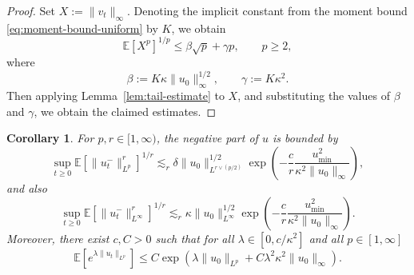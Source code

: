 \documentclass[a4paper,12pt]{article}
\newtheorem{corollary}[theorem]{Corollary}
\newcommand{\E}{\mathbb{E}}
\begin{document}
\begin{proof}
Set $X:=\| v_t\|_\infty$. Denoting the implicit constant from the moment bound  \eqref{eq:moment-bound-uniform} by $K$, we obtain
\[
\mathbb{E}[X^p]^{1/p} \leq \beta \sqrt{p} + \gamma p, \qquad p \geq 2, 
\]
where
\[ 
   \beta := K \kappa \| u_0 \|_{\infty}^{1 / 2},
     \qquad \gamma := K \kappa^2 . 
\]
Then applying Lemma~\ref{lem:tail-estimate} to $X$, and substituting the values of $\beta$ and $\gamma$,  we obtain the claimed estimates.
\end{proof}



\begin{corollary}
  \label{cor:exp-moments-u}
  For $p,r \in [1,\infty)$, the negative part of $u$ is bounded by
  \begin{equation}\label{eq:moments-negative-u}
      \sup_{t \geq 0} \E[\|u_t^-\|_{L^p}^r]^{1/r} \lesssim_r \delta \|u_0\|_{L^{r\vee (p/2)}}^{1/2}  \exp \left( -\frac{c}{r} \frac{u_{\min}^2}{\kappa^2 \|u_0\|_\infty}\right),
  \end{equation}
  and also
  \begin{equation}\label{eq:maximum-negative-u}
      \sup_{t \geq 0} \E[\|u_t^-\|_{L^\infty}^r]^{1/r} \lesssim_r \kappa \|u_0\|_{L^\infty}^{1/2}  \exp \left( -\frac{c}{r} \frac{u_{\min}^2}{\kappa^2 \|u_0\|_\infty}\right).
  \end{equation}
  Moreover, there exist  $c, C > 0$ such that   for all $\lambda \in
  [0, c/ \kappa^2]$ and all $p \in [1,\infty]$
  \begin{equation}\label{eq:exp-moments-u} \mathbb{E} [e^{\lambda \| u_t \|_{L^p}}] \leq C \exp (\lambda\|u_0\|_{L^p} + C \lambda^2 \kappa^2\|u_0\|_\infty ).
  \end{equation}
\end{corollary}
\end{document}
